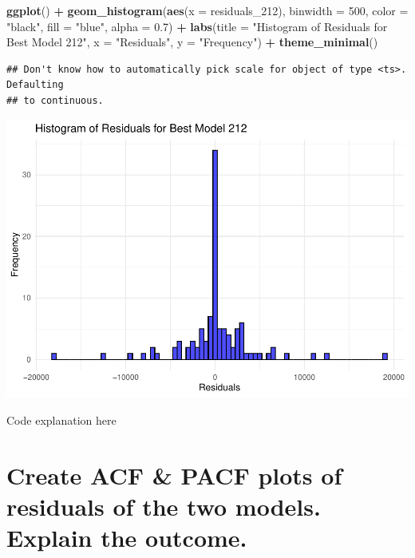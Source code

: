 \documentclass[
]{book}
\newenvironment{Shaded}{\begin{snugshade}}{\end{snugshade}}
\newcommand{\AttributeTok}[1]{\textcolor[rgb]{0.13,0.29,0.53}{#1}}
\newcommand{\DecValTok}[1]{\textcolor[rgb]{0.00,0.00,0.81}{#1}}
\newcommand{\FloatTok}[1]{\textcolor[rgb]{0.00,0.00,0.81}{#1}}
\newcommand{\FunctionTok}[1]{\textcolor[rgb]{0.13,0.29,0.53}{\textbf{#1}}}
\newcommand{\NormalTok}[1]{#1}
\newcommand{\SpecialCharTok}[1]{\textcolor[rgb]{0.81,0.36,0.00}{\textbf{#1}}}
\newcommand{\StringTok}[1]{\textcolor[rgb]{0.31,0.60,0.02}{#1}}
\begin{document}
\begin{Shaded}
\begin{Highlighting}[]
\FunctionTok{ggplot}\NormalTok{() }\SpecialCharTok{+}
  \FunctionTok{geom\_histogram}\NormalTok{(}\FunctionTok{aes}\NormalTok{(}\AttributeTok{x =}\NormalTok{ residuals\_212), }\AttributeTok{binwidth =} \DecValTok{500}\NormalTok{, }\AttributeTok{color =} \StringTok{"black"}\NormalTok{, }\AttributeTok{fill =} \StringTok{"blue"}\NormalTok{, }\AttributeTok{alpha =} \FloatTok{0.7}\NormalTok{) }\SpecialCharTok{+}
  \FunctionTok{labs}\NormalTok{(}\AttributeTok{title =} \StringTok{"Histogram of Residuals for Best Model 212"}\NormalTok{, }\AttributeTok{x =} \StringTok{"Residuals"}\NormalTok{, }\AttributeTok{y =} \StringTok{"Frequency"}\NormalTok{) }\SpecialCharTok{+}
  \FunctionTok{theme\_minimal}\NormalTok{()}
\end{Highlighting}
\end{Shaded}

\begin{verbatim}
## Don't know how to automatically pick scale for object of type <ts>. Defaulting
## to continuous.
\end{verbatim}

\includegraphics{bookdown-demo_files/figure-latex/unnamed-chunk-49-2.pdf}

Code explanation here

\section{Create ACF \& PACF plots of residuals of the two models. Explain the outcome.}\label{create-acf-pacf-plots-of-residuals-of-the-two-models.-explain-the-outcome.}
\end{document}
